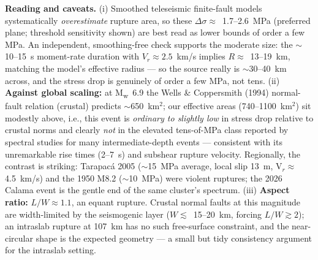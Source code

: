 \documentclass[11pt]{article}
\begin{document}
\textbf{Reading and caveats.} (i) Smoothed teleseismic finite-fault models systematically
\emph{overestimate} rupture area, so these $\Delta\sigma\approx$~1.7--2.6~MPa (preferred
plane; threshold sensitivity shown) are best read as lower bounds of order a few MPa. An
independent, smoothing-free check supports the moderate size: the $\sim$10--15~s moment-rate
duration with $V_r\approx2.5$~km/s implies $R\approx$~13--19~km, matching the model's
effective radius --- so the source really is $\sim$30--40~km across, and the stress drop is
genuinely of order a few MPa, not tens. (ii) \textbf{Against global scaling:} at
M\textsubscript{w}~6.9 the Wells \& Coppersmith (1994) normal-fault relation (crustal)
predicts $\sim$650~km$^2$; our effective areas (740--1100~km$^2$) sit modestly above, i.e.,
this event is \emph{ordinary to slightly low} in stress drop relative to crustal norms and
clearly \emph{not} in the elevated tens-of-MPa class reported by spectral studies for many
intermediate-depth events --- consistent with its unremarkable rise times (2--7~s) and
subshear rupture velocity. Regionally, the contrast is striking: Tarapac\'a 2005
($\sim$15~MPa average, local slip 13~m, V$_r\approx$4.5~km/s) and the 1950 M8.2
($\sim$10~MPa) were violent ruptures; the 2026 Calama event is the gentle end of the same
cluster's spectrum. (iii) \textbf{Aspect ratio:} $L/W\approx1.1$, an equant rupture.
Crustal normal faults at this magnitude are width-limited by the seismogenic layer
($W\lesssim$~15--20~km, forcing $L/W\gtrsim2$); an intraslab rupture at 107~km has no such
free-surface constraint, and the near-circular shape is the expected geometry --- a small but
tidy consistency argument for the intraslab setting.
\end{document}
